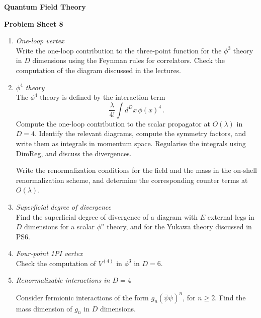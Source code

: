 \documentclass[12pt,a4paper]{article}
\newcommand{\psibar}{\bar{\psi}}
\begin{document}
\begin{center}
{\bf Quantum Field Theory}\\[\baselineskip]
\end{center}
{\bf Problem Sheet 8}

\begin{enumerate}
\item {\it One-loop vertex} \\

  Write the one-loop contribution to the three-point function for the
  $\phi^3$ theory in $D$ dimensions using the Feynman rules for
  correlators. Check the computation of the diagram discussed in the
  lectures. 
  
  \bigskip
  
\item {\it $\phi^4$ theory}\\

  The $\phi^4$ theory is defined by the interaction term
  \[
    \frac{\lambda}{4!} \int d^Dx\, \phi(x)^4\, .
  \]
  Compute the one-loop contribution to the scalar propagator at
  $O(\lambda)$ in $D=4$. Identify the relevant diagrams, compute the symmetry
  factors, and write them as integrals in momentum space. Regularise
  the integrals using DimReg, and discuss the divergences.

  Write the renormalization conditions for the field and the mass in
  the on-shell renormalization scheme, and determine the corresponding
  counter terms at $O(\lambda)$.
  
  \bigskip

\item {\it Superficial degree of  divergence}\\

  Find the superficial degree of divergence of a diagram with $E$
  external legs in $D$ dimensions for a scalar $\phi^n$ theory, and for
  the Yukawa theory discussed in PS6.

  \bigskip 
  
\item {\it Four-point 1PI vertex}\\
  
  Check the computation of $V^{(4)}$ in $\phi^3$ in $D=6$.
  
  \bigskip
  
\item {\it Renormalizable interactions in $D=4$}
  
  Consider fermionic interactions of the form $g_n (\psibar\psi)^n$,
  for $n \geq 2$. Find the mass dimension of $g_n$ in $D$ dimensions.
  

\end{enumerate}
\end{document}
